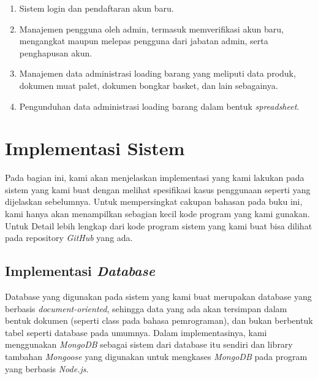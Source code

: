 \begin{enumerate}[nolistsep]

  \item Sistem login dan pendaftaran akun baru.
  \vspace{0.5ex}

  \item Manajemen pengguna oleh admin, termasuk memverifikasi akun baru, mengangkat maupun melepas pengguna dari jabatan admin, serta penghapusan akun.
  \vspace{0.5ex}

  \item Manajemen data administrasi loading barang yang meliputi data produk, dokumen muat palet, dokumen bongkar basket, dan lain sebagainya.
  \vspace{0.5ex}

  \item Pengunduhan data administrasi loading barang dalam bentuk \emph{spreadsheet}.
  \vspace{0.5ex}

\end{enumerate}
\vspace{0.5ex}

\section{Implementasi Sistem}
\vspace{1ex}

Pada bagian ini, kami akan menjelaskan implementasi yang kami lakukan pada sistem yang kami buat dengan melihat spesifikasi kasus penggunaan seperti yang dijelaskan sebelumnya.
Untuk mempersingkat cakupan bahasan pada buku ini, kami hanya akan menampilkan sebagian kecil kode program yang kami gunakan.
Untuk Detail lebih lengkap dari kode program sistem yang kami buat bisa dilihat pada repository \emph{GitHub} \citep{repoGithub} yang ada.

\subsection{Implementasi \emph{Database}}
\vspace{1ex}

Database yang digunakan pada sistem yang kami buat merupakan database yang berbasis \emph{document-oriented}, sehingga data yang ada akan tersimpan dalam bentuk dokumen (seperti class pada bahasa pemrograman), dan bukan berbentuk tabel seperti database pada umumnya.
Dalam implementasinya, kami menggunakan \emph{MongoDB} sebagai sistem dari database itu sendiri dan library tambahan \emph{Mongoose} yang digunakan untuk mengkases \emph{MongoDB} pada program yang berbasis \emph{Node.js}.

